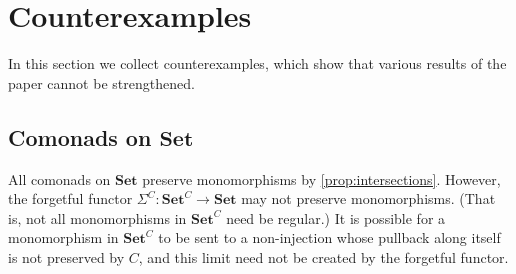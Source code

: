 \documentclass[11pt, oneside, article]{memoir}
\makeatletter
\theoremstyle{plain}
\theoremstyle{definition}
\theoremstyle{remark}
\def\theHsection{\theHchapter.\arabic{section}}
\def\theHtheorem{\theHsection.\arabic{theorem}}
\def\theHcorollary{\theHsection.\arabic{theorem}}
\def\theHproposition{\theHsection.\arabic{theorem}}
\def\theHlemma{\theHsection.\arabic{theorem}}
\def\theHconjecture{\theHsection.\arabic{theorem}}
\def\theHdefinition{\theHsection.\arabic{theorem}}
\def\theHmyremark{\theHsection.\arabic{theorem}}
\def\theHmyexample{\theHsection.\arabic{theorem}}
\def\theHmyconvention{\theHsection.\arabic{theorem}}
\def\theHmywarning{\theHsection.\arabic{theorem}}
\def\theHmycounterexample{\theHsection.\arabic{theorem}}
\def\theHdef{\theHsection.\arabic{theorem}}
\def\theHrem{\theHsection.\arabic{theorem}}
\let\@origchapter\chapter
\renewcommand{\thechapter}{\arabic{chapter}}
\newif\if@inappendixmode
\newcommand{\@syncthmdisplay}{%
  \global\let\thedef\thetheorem
  \global\let\therem\thetheorem
  \global\let\thedefinition\thetheorem
  \global\let\thelemma\thetheorem
  \global\let\thecorollary\thetheorem
  \global\let\theproposition\thetheorem
  \global\let\theconjecture\thetheorem
  \global\let\themyremark\thetheorem
  \global\let\themyexample\thetheorem
  \global\let\themyconvention\thetheorem
  \global\let\themywarning\thetheorem
  \global\let\themycounterexample\thetheorem
}
\newcommand{\@syncthmH}[1]{%
  \gdef\theHtheorem{#1}\gdef\theHcorollary{#1}\gdef\theHproposition{#1}%
  \gdef\theHlemma{#1}\gdef\theHconjecture{#1}\gdef\theHdefinition{#1}%
  \gdef\theHmyremark{#1}\gdef\theHmyexample{#1}\gdef\theHmyconvention{#1}%
  \gdef\theHmywarning{#1}\gdef\theHmycounterexample{#1}%
  \gdef\theHdef{#1}\gdef\theHrem{#1}%
}
\renewcommand{\chapter}{%
  \if@inappendixmode%
    \renewcommand{\thechapter}{\Alph{chapter}}%
    \renewcommand{\theHchapter}{\Alph{chapter}}%
    \counterwithout*{theorem}{section}%
    \gdef\thetheorem{\thechapter.\arabic{theorem}}%
    \@syncthmdisplay
    \@syncthmH{\theHchapter.\arabic{theorem}}%
  \else
    \renewcommand{\thechapter}{\arabic{chapter}}%
    \renewcommand{\theHchapter}{\arabic{chapter}}%
  \fi
  \@origchapter
}
\newcommand{\namedcat}[1]{\mathbf{#1}}
\newcommand{\Set}{\namedcat{Set}}
\newcommand{\CoalgOn}[2]{{#2}^{#1}}
\newcommand{\CoalgSet}[1]{\CoalgOn{#1}{\Set}}
\newcommand{\carr}{\Sigma}
\newcommand{\car}[1]{\carr^{#1}}
\newcommand{\carC}{\car{\cC}}
\newcommand{\cmnd}[1]{{#1}}
\newcommand{\cC}{\cmnd{C}}
\newcommand{\CSet}{\CoalgSet{\cC}}
\makeatother
\begin{document}
\chapter{Counterexamples}\label{app:counterexamples}

In this section we collect counterexamples, which show that various
results of the paper cannot be strengthened.

\section*{Comonads on $\Set$}

All comonads on $\Set$ preserve monomorphisms by
\cref{prop:intersections}. However, the
forgetful functor $\carC \colon \CSet \to \Set$ may not preserve
monomorphisms. (That is, not all monomorphisms in $\CSet$ need be
regular.) It is possible for a monomorphism in $\CSet$ to be sent to a
non-injection whose pullback along itself is not preserved by $\cC$,
and this limit need not be created by the forgetful functor.
\end{document}

